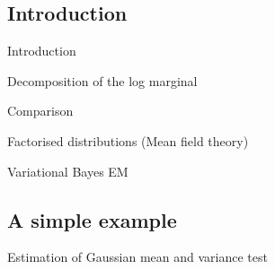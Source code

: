 \subsection{Introduction}
\begin{frame}{Introduction}
\end{frame}
\begin{frame}{Decomposition of the log marginal}
\end{frame}
\begin{frame}{Comparison}
\end{frame}
\begin{frame}{Factorised distributions (Mean field theory)}
\end{frame}
\begin{frame}{Variational Bayes EM}
\end{frame}

\subsection{A simple example}
\begin{frame}{Estimation of Gaussian mean and variance}
test
\end{frame}